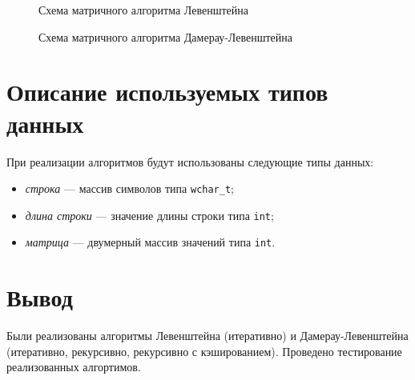\begin{figure}[H]
    \centering
    
    \caption{Схема матричного алгоритма Левенштейна}
    \label{fig:lev-iter}
\end{figure}

\begin{figure}[H]
    \centering
    
    \caption{Схема матричного алгоритма Дамерау-Левенштейна}
    \label{fig:dam-lev-iter}
\end{figure}


\section{Описание используемых типов данных}

При реализации алгоритмов будут использованы следующие типы данных:

\begin{itemize}
    \item \textit{строка} --- массив символов типа \texttt{wchar\_t};
    \item \textit{длина строки} --- значение длины строки типа \texttt{int};
    \item \textit{матрица} --- двумерный массив значений типа \texttt{int}.
\end{itemize}

\section*{Вывод}

Были реализованы алгоритмы Левенштейна (итеративно) и Дамерау-Левенштейна (итеративно, рекурсивно, рекурсивно с кэшированием). Проведено тестирование реализованных алгортимов.
